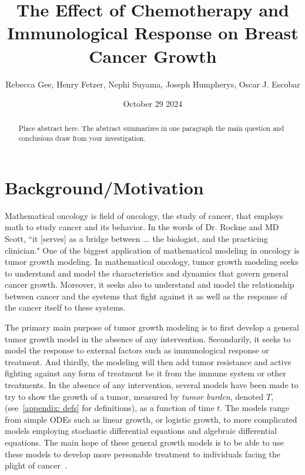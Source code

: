 \documentclass[11pt]{amsart}
\title{The Effect of Chemotherapy and Immunological Response on Breast Cancer Growth}
\author{Rebecca Gee, Henry Fetzer, Nephi Suyama, Joseph Humpherys, Oscar J. Escobar}
\date{October 29 2024} %
\begin{document}
\maketitle %

\begin{abstract}
Place abstract here. The abstract summarizes in one paragraph the main question and conclusions draw from your investigation.
\end{abstract}

\section{Background/Motivation}

Mathematical oncology is field of oncology, the study of cancer, that employs math to study cancer and its behavior.
In the words of Dr. Rockne and MD Scott, ``it [serves] as a bridge between $\ldots$ the biologist, and the practicing clinician." \cite{IntroMathOnc}
One of the biggest application of mathematical modeling in oncology is tumor growth modeling.
In mathematical oncology, tumor growth modeling seeks to understand and model the characteristics and dynamics that govern general cancer growth.
Moreover, it seeks also to understand and model the relationship between cancer and the systems that fight against it as well as the response of the cancer itself to these systems.

The primary main purpose of tumor growth modeling is to first develop a general tumor growth model in the absence of any intervention.
Secondarily, it seeks to model the response to external factors such as immunological response or treatment. 
And thirdly, the modeling will then add tumor resistance and active fighting against any form of treatment be it from the immune system or other treatments.
In the absence of any intervention, several models have been made to try to show the growth of a tumor, measured by \textit{tumor burden}, denoted $T$, (see\ \ref{appendix: defs} for definitions), as a function of time $t$.
The models range from simple ODEs such as linear growth, or logistic growth, to more complicated models employing stochastic differential equations and algebraic differential equations. 
The main hope of these general growth models is to be able to use these models to develop more personable treatment to individuals facing the plight of cancer\ \cite{YinMoes}.
\end{document}
